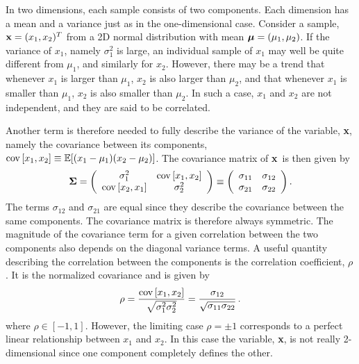 \documentclass[times,12pt]{article}    %
\def\x{{\bf x}}
\def\m{\text{\boldmath $\mu$}}
\def\S{\text{\boldmath $\Sigma$}}
\begin{document}
In two dimensions, each sample consists of two components. Each
dimension has a mean and a variance just as in the one-dimensional
case. Consider a sample, $\x=(x_1,x_2)^T$ from a 2D normal
distribution with mean $\m = (\mu_1, \mu_2)$. If the variance of
$x_1$, namely $\sigma_1^2$ is large, an individual sample of $x_1$
may well be quite different from $\mu_1$, and similarly for $x_2$.
However, there may be a trend that whenever $x_1$ is larger than
$\mu_1$, $x_2$ is also larger than $\mu_2$, and that whenever
$x_1$ is smaller than $\mu_1$, $x_2$ is also smaller than $\mu_2$.
In such a case, $x_1$ and $x_2$ are not independent, and they are
said to be correlated.

Another term is therefore needed to fully describe the variance of the
variable, \x, namely the covariance between its components,
${\rm{cov}} \left[x_1,x_2 \right] \equiv {\mathbb E}[(x_1 -\mu_1)(x_2-\mu_2)]$. The covariance matrix of \x\ is then given by
\begin{equation}
  \label{eq:Sigma}
  \S = \left(
    \begin{array}{cc}
      \sigma_1^2 & {\rm{cov}} \left[x_1,x_2 \right]\\
      {\rm{cov}} \left[x_2,x_1 \right] & \sigma_2^2
    \end{array}
\right) \equiv \left(
    \begin{array}{cc}
      \sigma_{11} & \sigma_{12}\\
      \sigma_{21} & \sigma_{22}
    \end{array}
  \right).
\end{equation}
The terms $\sigma_{12}$ and $\sigma_{21}$ are equal since they
describe the covariance between the same components. The covariance
matrix is therefore always symmetric. The magnitude of the covariance
term for a given correlation between the two components also depends on
the diagonal variance terms. A useful quantity describing
the correlation between the components is the correlation coefficient,
$\rho$. It is the normalized covariance and is given by
\begin{equation}
  \label{eq:k}
  \rho = \frac{{\rm{cov}} \left[x_1,x_2 \right]}{\sqrt{\sigma_{1}^2\sigma_{2}^2}} = \frac{\sigma_{12}}{\sqrt{\sigma_{11}\sigma_{22}}}\,.
\end{equation}
where $\rho \in [-1,1]$. However, the limiting case $\rho=\pm1$ corresponds to a
perfect linear relationship between $x_1$ and $x_2$. In this case the
variable, \x, is not really 2-dimensional since one component
completely defines the other.
\end{document}
